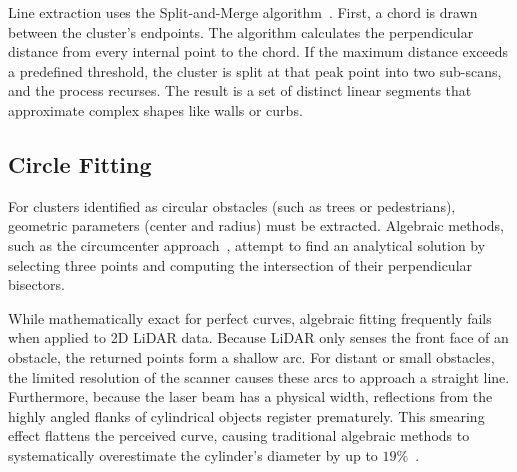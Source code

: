 Line extraction uses the Split-and-Merge algorithm~\cite{nguyen2005lineextraction}. First, a chord is drawn between the cluster's endpoints. The algorithm calculates the perpendicular distance from every internal point to the chord. If the maximum distance exceeds a predefined threshold, the cluster is split at that peak point into two sub-scans, and the process recurses. The result is a set of distinct linear segments that approximate complex shapes like walls or curbs.

\subsection{Circle Fitting}
\label{subsec:circle-fitting}

For clusters identified as circular obstacles (such as trees or pedestrians), geometric parameters (center and radius) must be extracted. Algebraic methods, such as the circumcenter approach~\cite{xavier2005circledetection}, attempt to find an analytical solution by selecting three points and computing the intersection of their perpendicular bisectors.

While mathematically exact for perfect curves, algebraic fitting frequently fails when applied to 2D LiDAR data. Because LiDAR only senses the front face of an obstacle, the returned points form a shallow arc. For distant or small obstacles, the limited resolution of the scanner causes these arcs to approach a straight line. Furthermore, because the laser beam has a physical width, reflections from the highly angled flanks of cylindrical objects register prematurely. This smearing effect flattens the perceived curve, causing traditional algebraic methods to systematically overestimate the cylinder's diameter by up to $19\%$~\cite{forsman2017bias}.
